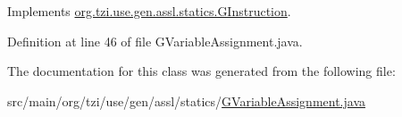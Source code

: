 Implements \hyperlink{interfaceorg_1_1tzi_1_1use_1_1gen_1_1assl_1_1statics_1_1_g_instruction_a2ce478cb4d7c839fec6db330099638a9}{org.\-tzi.\-use.\-gen.\-assl.\-statics.\-G\-Instruction}.



Definition at line 46 of file G\-Variable\-Assignment.\-java.



The documentation for this class was generated from the following file\-:\begin{DoxyCompactItemize}
\item 
src/main/org/tzi/use/gen/assl/statics/\hyperlink{_g_variable_assignment_8java}{G\-Variable\-Assignment.\-java}\end{DoxyCompactItemize}
